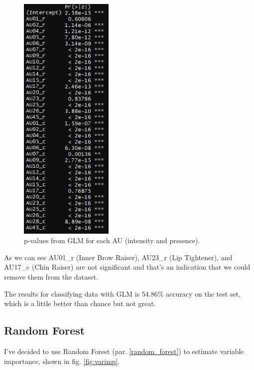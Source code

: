 \begin{figure}[H]
	\centering
	\includegraphics[width=0.4\textwidth]{images/pval}
	\caption{p-values from GLM for each AU (intensity and presence).}
	\label{fig:pval}
\end{figure}

As we can see AU01\_r (Inner Brow Raiser), AU23\_r (Lip Tightener), and AU17\_c (Chin Raiser) are not significant and that's an indication that we could remove them from the dataset.

The results for classifying data with GLM is 54.86\% accuracy on the test set, which is a little better than chance but not great. 

\clearpage

\subsection{Random Forest} \label{rf}
I've decided to use Random Forest (par. \ref{random_forest}) to estimate variable importance, shown in fig. \ref{fig:varimp}.

